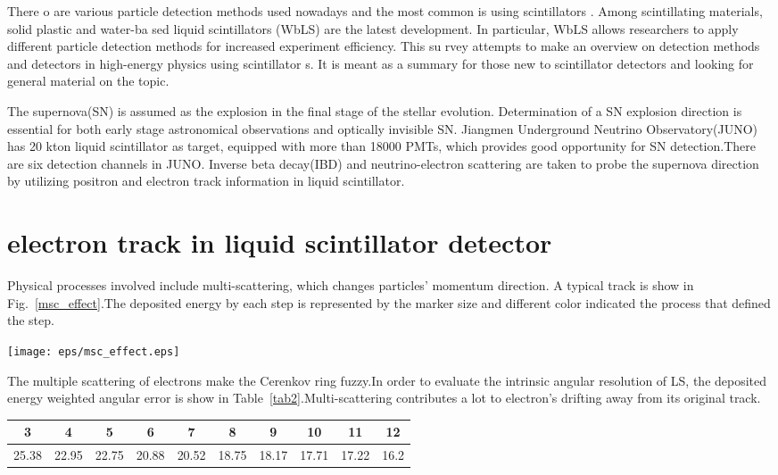\documentclass[a4paper,10pt]{cpc-hepnp}
\begin{document}
There o are various particle detection methods used nowadays and the most common is using scintillators . Among 
scintillating materials, solid plastic and water-ba sed liquid scintillators (WbLS) are the latest development. In 
particular, WbLS allows researchers to apply different particle detection methods for increased experiment efficiency. This su
rvey attempts to make an overview on detection methods and detectors in high-energy physics using scintillator
s. It is meant as a summary for those new to scintillator detectors and looking for 
general material on the topic. 


The supernova(SN) is assumed as the explosion in the final stage of the
stellar evolution. Determination of a SN explosion direction is essential for
both early stage astronomical observations and optically invisible SN.
Jiangmen Underground Neutrino Observatory(JUNO) has 20 kton liquid
scintillator as target, equipped with more than 18000 PMTs, which provides good
opportunity for SN detection.There are six detection channels in JUNO.
Inverse beta decay(IBD) and neutrino-electron scattering are taken to probe the
supernova direction by utilizing positron and electron track information in
liquid scintillator.
\section{electron track in liquid scintillator detector}
Physical processes involved include multi-scattering, which changes
particles' momentum direction. A typical track is show in
Fig.~\ref{msc_effect}.The deposited energy by each step is
represented by the marker size and different color indicated the process that
defined the step.
\begin{center}
\texttt{[image: eps/msc\_effect.eps]}
\end{center}

The multiple scattering of electrons make the Cerenkov ring fuzzy.In order to
evaluate the intrinsic angular resolution of LS, the deposited energy weighted
angular error is show in Table~\ref{tab2}.Multi-scattering
contributes a lot to electron's drifting away from its original track.

\begin{center}
\footnotesize
\begin{tabular*}{170mm}{@{\extracolsep{\fill}}cccccccccc}
\toprule 3&4&5&6&7&8&9&10&11&12\\
\hline
25.38&22.95&22.75&20.88&20.52&18.75&18.17&17.71&17.22&16.2\\
\bottomrule
\end{tabular*}
\end{center}
\end{document}
